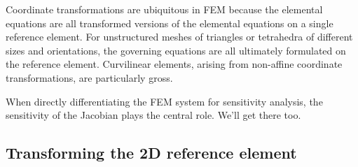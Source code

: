 Coordinate transformations are ubiquitous in FEM because the elemental equations are all transformed versions of the elemental equations on a single reference element.  For unstructured meshes of triangles or tetrahedra of different sizes and orientations, the governing equations are all ultimately formulated on the reference element.  Curvilinear elements, arising from non-affine coordinate transformations, are particularly gross.

When directly differentiating the FEM system for sensitivity analysis, the sensitivity of the Jacobian plays the central role.  We'll get there too.

\subsection{Transforming the 2D reference element}

